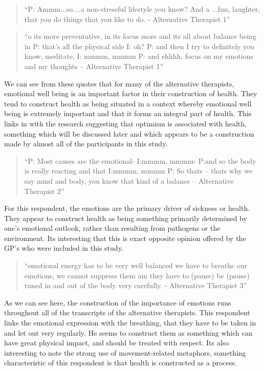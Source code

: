 \begin{quotation}
``P: Ammm...so....a non-stressful lifestyle you know? And a ...fun, laughter, that you do things that you like to do. - Alternative Therapist 1''  
\end{quotation}


\begin{quotation}
``o its more preventative, in its focus more and its all about balance being in
P: that's all the physical side
I: oh?
P: and then I try to definitely you know, meditate, 
I: mmmm, mmmm
P: and ehhhh, focus on my emotions and my thoughts – Alternative Therapist 1''  
\end{quotation}


We can see from these quotes that for many of the alternative therapists, emotional well being is an important factor in their construction of health. They tend to construct health as being situated in a context whereby emotional well being is extremely important and that it forms an integral part of health. This links in with the research suggesting that optimism is associated with health, something which will be discussed later and which appears to be a construction made by almost all of the participants in this study. 

\begin{quotation}
``P: Most causes are the emotional-
I:mmmm, mmmm-
P:and so the body is really reacting and that
I:mmmm, mmmm
P: So thats – thats why we say mind and body, you know that kind of a balance – Alternative Therapist 2''  
\end{quotation}


For this respondent, the emotions are the primary driver of sickness or health. They appear to construct health as being something primarily determined by one's emotional outlook, rather than resulting from pathogens or the environment. Its interesting that this is exact opposite opinion offered by the GP's who were included in this study. 

\begin{quotation}
``emotional energy has to be very well balanced we have to breathe our emotions, we cannot suppress them am they have to (pause) be (pause) tuned in and out of the body very carefully. - Alternative Therapist 3''  
\end{quotation}



As we can see here, the construction of the importance of emotions runs throughout all of the transcripts of the alternative therapists. This respondent links the emotional expression with the breathing, that they have to be taken in and let out very regularly. He seems to construct them as something which can have great physical impact, and should be treated with respect. Its also interesting to note the strong use of movement-related metaphors, something characteristic of this respondent is that health is constructed as a process. 


